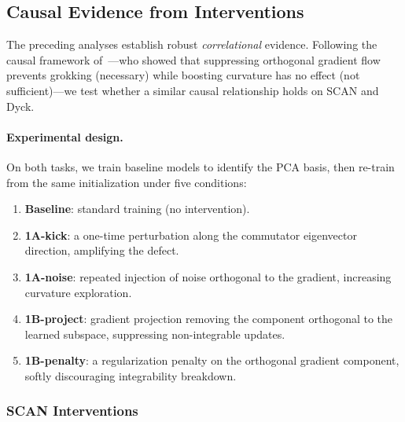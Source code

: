 \documentclass[11pt]{article}
\begin{document}
\subsection{Causal Evidence from Interventions}
\label{sec:interventions}

The preceding analyses establish robust \emph{correlational} evidence. Following the causal framework of~\citet{xu2026integrability}---who showed that suppressing orthogonal gradient flow prevents grokking (necessary) while boosting curvature has no effect (not sufficient)---we test whether a similar causal relationship holds on SCAN and Dyck.

\paragraph{Experimental design.}
On both tasks, we train baseline models to identify the PCA basis, then re-train from the same initialization under five conditions:
\begin{enumerate}
  \item \textbf{Baseline}: standard training (no intervention).
  \item \textbf{1A-kick}: a one-time perturbation along the commutator eigenvector direction, amplifying the defect.
  \item \textbf{1A-noise}: repeated injection of noise orthogonal to the gradient, increasing curvature exploration.
  \item \textbf{1B-project}: gradient projection removing the component orthogonal to the learned subspace, suppressing non-integrable updates.
  \item \textbf{1B-penalty}: a regularization penalty on the orthogonal gradient component, softly discouraging integrability breakdown.
\end{enumerate}

\subsubsection{SCAN Interventions}
\end{document}
